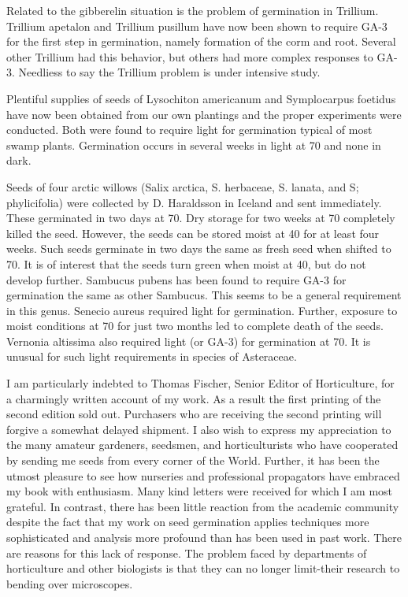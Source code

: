 Related to the gibberelin situation is the problem of germination in Trillium.
Trillium apetalon and Trillium pusillum have now been shown to require GA-3 for the
first step in germination, namely formation of the corm and root. Several other Trillium
had this behavior, but others had more complex responses to GA-3. Needliess to say
the Trillium problem is under intensive study.

Plentiful supplies of seeds of Lysochiton americanum and Symplocarpus
foetidus have now been obtained from our own plantings and the proper experiments
were conducted. Both were found to require light for germination typical of most
swamp plants. Germination occurs in several weeks in light at 70 and none in dark.

Seeds of four arctic willows (Salix arctica, S. herbaceae, S. lanata, and S;
phylicifolia) were collected by D. Haraldsson in Iceland and sent immediately. These
germinated in two days at 70. Dry storage for two weeks at 70 completely killed the
seed. However, the seeds can be stored moist at 40 for at least four weeks. Such
seeds germinate in two days the same as fresh seed when shifted to 70. It is of
interest that the seeds turn green when moist at 40, but do not develop further.
Sambucus pubens has been found to require GA-3 for germination the same as
other Sambucus. This seems to be a general requirement in this genus.
Senecio aureus required light for germination. Further, exposure to moist
conditions at 70 for just two months led to complete death of the seeds. Vernonia
altissima also required light (or GA-3) for germination at 70. It is unusual for such light
requirements in species of Asteraceae.

I am particularly indebted to Thomas Fischer, Senior Editor of Horticulture,
for a charmingly written account of my work. As a result the first printing of
the second edition sold out. Purchasers who are receiving the second printing
will forgive a somewhat delayed shipment. I also wish to express my
appreciation to the many amateur gardeners, seedsmen, and horticulturists who
have cooperated by sending me seeds from every corner of the World. Further,
it has been the utmost pleasure to see how nurseries and professional
propagators have embraced my book with enthusiasm. Many kind letters were
received for which I am most grateful. In contrast, there has been little
reaction from the academic community despite the fact that my work on seed
germination applies techniques more sophisticated and analysis more profound
than has been used in past work. There are reasons for this lack of response.
The problem faced by departments of horticulture and other biologists is that
they can no longer limit-their research to bending over microscopes.

